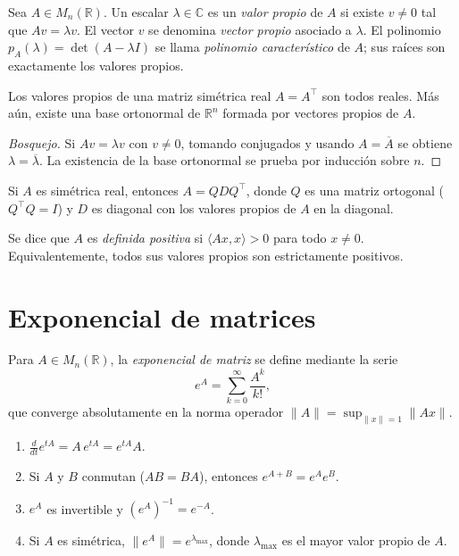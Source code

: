 \begin{definition}
\label{def:valor-propio-ap}
Sea $A\in M_n(\mathbb{R})$. Un escalar $\lambda\in\mathbb{C}$ es un \emph{valor propio} de $A$ si existe $v\neq 0$ tal que $Av=\lambda v$. El vector $v$ se denomina \emph{vector propio} asociado a $\lambda$. El polinomio $p_A(\lambda)=\det(A-\lambda I)$ se llama \emph{polinomio característico} de $A$; sus raíces son exactamente los valores propios.
\end{definition}

\begin{theorem}
Los valores propios de una matriz simétrica real $A=A^{\top}$ son todos reales. Más aún, existe una base ortonormal de $\mathbb{R}^n$ formada por vectores propios de $A$.
\end{theorem}
\begin{proof}[Bosquejo]
Si $Av=\lambda v$ con $v\neq 0$, tomando conjugados y usando $A=\overline{A}$ se obtiene $\lambda=\overline{\lambda}$. La existencia de la base ortonormal se prueba por inducción sobre $n$.
\end{proof}

\begin{theorem}
\label{teo:espectral-ap}
Si $A$ es simétrica real, entonces $A=QDQ^{\top}$, donde $Q$ es una matriz ortogonal ($Q^{\top}Q=I$) y $D$ es diagonal con los valores propios de $A$ en la diagonal.
\end{theorem}

\begin{definition}
Se dice que $A$ es \emph{definida positiva} si $\langle Ax,x\rangle>0$ para todo $x\neq 0$. Equivalentemente, todos sus valores propios son estrictamente positivos.
\end{definition}

\section{Exponencial de matrices}

\begin{definition}
\label{def:exponencial-matriz-ap}
Para $A\in M_n(\mathbb{R})$, la \emph{exponencial de matriz} se define mediante la serie
\[
  e^{A}=\sum_{k=0}^{\infty}\frac{A^k}{k!},
\]
que converge absolutamente en la norma operador $\|A\|=\sup_{\|x\|=1}\|Ax\|$.
\end{definition}

\begin{theorem}
\label{teo:prop-exponencial-ap}
\begin{enumerate}
  \item[(i)] $\frac{d}{dt}e^{tA}=A\,e^{tA}=e^{tA}A$.
  \item[(ii)] Si $A$ y $B$ conmutan ($AB=BA$), entonces $e^{A+B}=e^{A}e^{B}$.
  \item[(iii)] $e^{A}$ es invertible y $(e^{A})^{-1}=e^{-A}$.
  \item[(iv)] Si $A$ es simétrica, $\|e^{A}\|=e^{\lambda_{\max}}$, donde $\lambda_{\max}$ es el mayor valor propio de $A$.
\end{enumerate}
\end{theorem}

